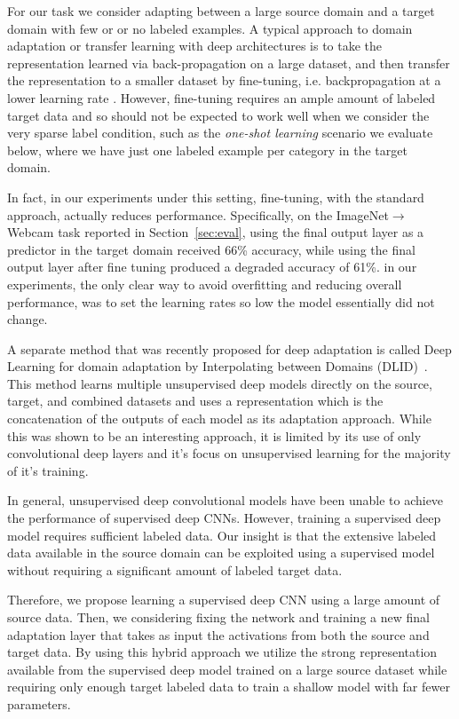 \label{sec:decaf}
For our task we consider adapting between a large source domain and a target domain with few or or no labeled examples. 
A typical approach to domain adaptation or transfer learning with deep architectures is to take the representation learned via back-propagation on a large dataset, and then transfer the representation to a smaller dataset by fine-tuning, i.e. backpropagation at a lower learning rate \cite{rcnn,zeiler-arxiv-2013}.
However, fine-tuning requires an ample amount of labeled target data and so should not be expected to work well when we consider the very sparse label condition, such as the \textit{one-shot learning} scenario we evaluate below, where we have just one labeled example per category in the target domain.

In fact, in our experiments under this setting, fine-tuning, with the standard approach, actually reduces performance.
Specifically, on the ImageNet$\rightarrow$Webcam task reported in Section~\ref{sec:eval}, using the final output layer as a predictor in the target domain received 66\% accuracy, while using the final output layer after fine tuning produced a degraded accuracy of 61\%. in our experiments, the only clear way to avoid overfitting and reducing overall performance, was to set the learning rates so low the model essentially did not change.

A separate method that was recently proposed for deep adaptation is called Deep Learning for domain adaptation by Interpolating between Domains (DLID)~\cite{ref:dlid}. This method learns multiple unsupervised deep models directly on the source, target, and combined datasets and uses a representation which is the concatenation of the outputs of each model as its adaptation approach. 
While this was shown to be an interesting approach, it is limited by its use of only convolutional deep layers and it's focus on unsupervised learning for the majority of it's training.

In general, unsupervised deep convolutional models have been unable to achieve the performance of supervised deep CNNs. However, training a supervised deep model requires sufficient labeled data. Our insight is that the extensive labeled data available in the source domain can be exploited using a supervised model without requiring a significant amount of labeled target data.

Therefore, we propose learning a supervised deep CNN using a large amount of source data. Then, we considering fixing the network and training a new final adaptation layer that takes as input the activations from both the source and target data. By using this hybrid approach we utilize the strong representation available from the supervised deep model trained on a large source dataset while requiring only enough target labeled data to train a shallow model with far fewer parameters. 


